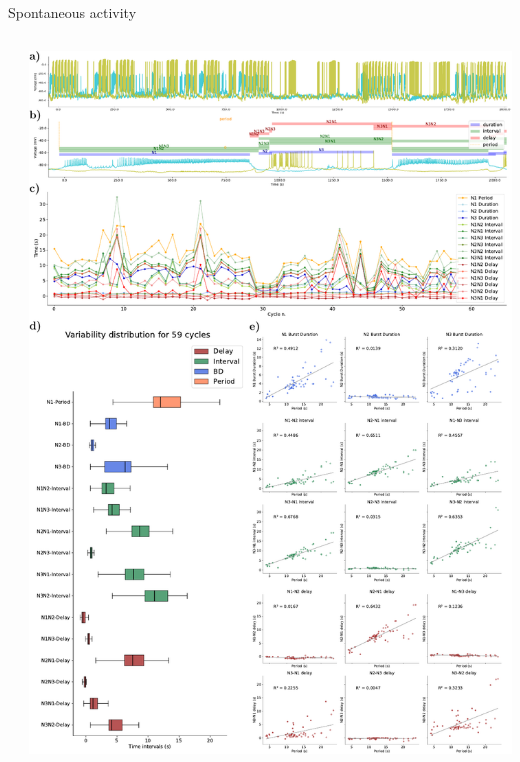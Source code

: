 \documentclass[aspectratio=43]{beamer}
\begin{document}
\begin{frame}{Spontaneous activity}
\begin{columns}
\begin{column}{0.5\textwidth}
		\end{column}
		\begin{column}{0.5\textwidth}
			\includegraphics[width=\textwidth]{invariants/data/SUSSEX/prep3/images/3phases/panel_with_intervals.pdf}
		\end{column}
	\end{columns}
\end{frame}
\end{document}
